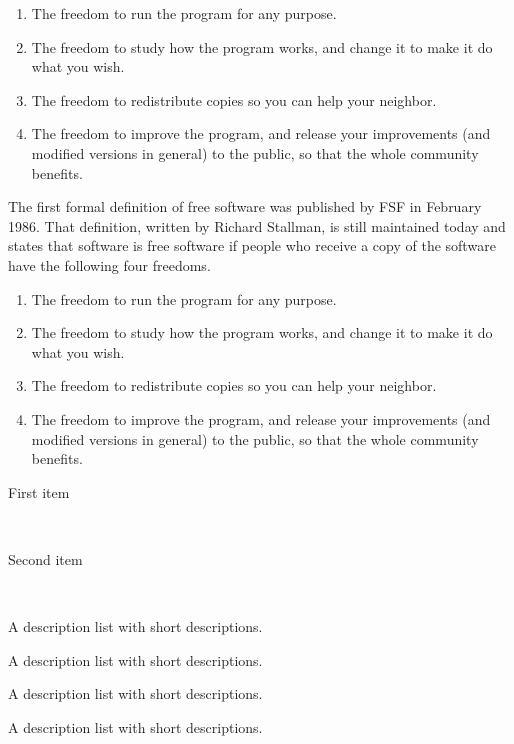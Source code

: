 \begin{enumerate}[label=(\alph*)]
  \item The freedom to run the program for any purpose.
  \item The freedom to study how the program works, and change it to make it do what you wish.
  \item The freedom to redistribute copies so you can help your neighbor.
  \item The freedom to improve the program, and release your improvements (and modified versions in general) to the public, so that the whole community benefits.
\end{enumerate}

The first formal definition of free software was published by FSF in February 1986. That definition, written by Richard Stallman, is still maintained today and states that software is free software if people who receive a copy of the software have the following four freedoms.

\begin{enumerate}
  \item The freedom to run the program for any purpose.
  \item The freedom to study how the program works, and change it to make it do what you wish.
  \item The freedom to redistribute copies so you can help your neighbor.
  \item The freedom to improve the program, and release your improvements (and modified versions in general) to the public, so that the whole community benefits.
\end{enumerate}

\lipsum[1]

\begin{description}
  \item[First item] \hfill \\
    \lipsum[2]
  \item[Second item] \hfill \\
    \lipsum[2]
\end{description}

\lipsum[1]

\begin{description}[style=multiline,leftmargin=1.0cm]
  \item[A0]
    A description list with short descriptions.
  \item[A1]
    A description list with short descriptions.
  \item[A2]
    A description list with short descriptions.
  \item[A3]
    A description list with short descriptions.
\end{description}


